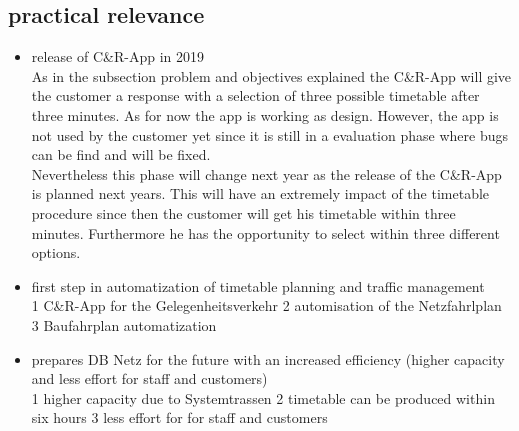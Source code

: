 \subsection{practical relevance}
\begin{itemize}
  \item release of C\&R-App in 2019 \\
  As in the subsection problem and objectives explained the C\&R-App will give the customer a response with a selection of three possible 
  timetable after three minutes. As for now the app is working as design. However, the app is not used by the customer yet since it is still in a 
  evaluation phase where bugs can be find and will be fixed. \\
  Nevertheless this phase will change next year as the release of the C\&R-App is planned next years. This will have an extremely impact of the 
  timetable procedure since then the customer will get his timetable within three minutes. Furthermore he has the opportunity to select within three 
  different options. 

  \item first step in automatization of timetable planning and traffic management \\
  1 C\&R-App for the Gelegenheitsverkehr
  2 automisation of the Netzfahrlplan 
  3 Baufahrplan automatization 

  \item prepares DB Netz for the future with an increased efficiency (higher capacity and less effort for staff and customers) \\
  1 higher capacity due to Systemtrassen
  2 timetable can be produced within six hours
  3 less effort for for staff and customers
\end{itemize}
